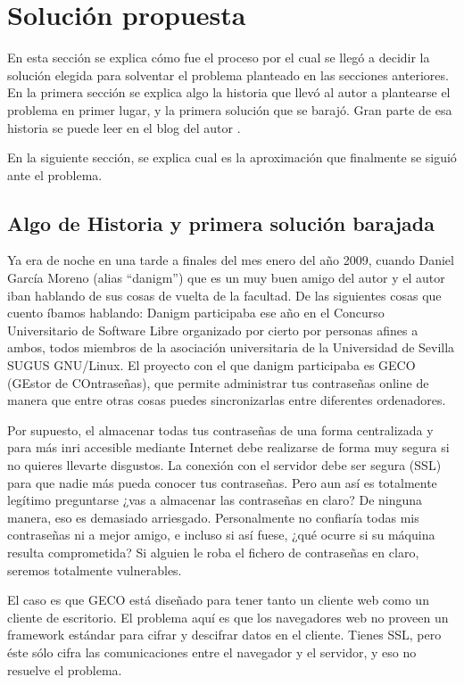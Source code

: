 \chapter{Solución propuesta}\label{solucionpropuesta}

En esta sección se explica cómo fue el proceso por el cual se llegó a decidir la solución elegida para solventar el problema planteado en las secciones anteriores. En la primera sección se explica algo la historia que llevó al autor a plantearse el problema en primer lugar, y la primera solución que se barajó. Gran parte de esa historia se puede leer en el blog del autor \cite{web-encryption-framework}.

En la siguiente sección, se explica cual es la aproximación que finalmente se siguió ante el problema. 

\section{Algo de Historia y primera solución barajada}\label{posiblessoluciones}

Ya era de noche en una tarde a finales del mes enero del año 2009, cuando Daniel García Moreno (alias ``danigm'') que es un muy buen amigo del autor y el autor iban hablando de sus cosas de vuelta de la facultad. De las siguientes cosas que cuento íbamos hablando: Danigm participaba ese año en el Concurso Universitario de Software Libre organizado por cierto por personas afines a ambos, todos miembros de la asociación universitaria de la Universidad de Sevilla SUGUS GNU/Linux. El proyecto con el que danigm participaba es GECO (GEstor de COntraseñas), que permite administrar tus contraseñas online  de manera que entre otras cosas puedes sincronizarlas entre diferentes ordenadores.

Por supuesto, el almacenar todas tus contraseñas de una forma centralizada y para más inri accesible mediante Internet debe realizarse de forma muy segura si no quieres llevarte disgustos. La conexión con el servidor debe ser segura (SSL) para que nadie más pueda conocer tus contraseñas. Pero aun así es totalmente legítimo preguntarse ¿vas a almacenar las contraseñas en claro? De ninguna manera, eso es demasiado arriesgado. Personalmente no confiaría todas mis contraseñas ni a mejor amigo, e incluso si así fuese, ¿qué ocurre si su máquina resulta comprometida? Si alguien le roba el fichero de contraseñas en claro, seremos totalmente vulnerables.

El caso es que GECO está diseñado para tener tanto un cliente web como un cliente de escritorio. El problema aquí es que los navegadores web no proveen un framework estándar para cifrar y descifrar datos en el cliente. Tienes SSL, pero éste sólo cifra las comunicaciones entre el navegador y el servidor, y eso no resuelve el problema.

